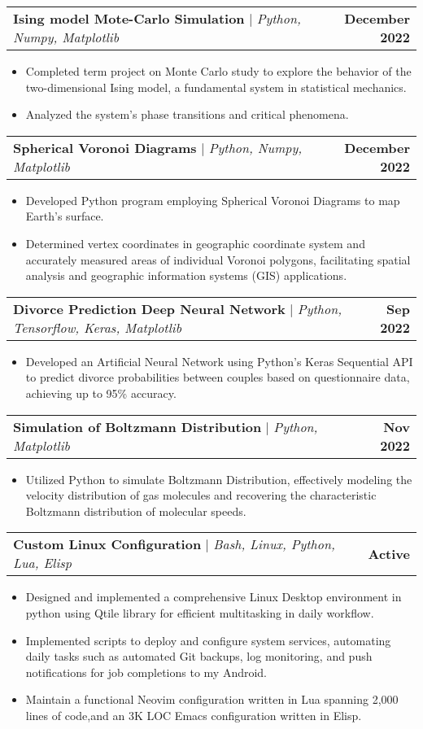 \documentclass[a4paper,11pt]{article}
\makeatletter
\newcommand{\resumeItem}[1]{
  \item\small{
    {#1 \vspace{-2pt}}
  }
}
\newcommand{\resumeProjectHeading}[2]{
    \item
    \begin{tabular*}{1.001\textwidth}{l@{\extracolsep{\fill}}r}
      \small#1 & \textbf{\small #2}\\
    \end{tabular*}\vspace{-7pt}
}
\newcommand{\resumeItemListStart}{\begin{itemize}}
\newcommand{\resumeItemListEnd}{\end{itemize}\vspace{-5pt}}
\makeatother
\begin{document}
          \resumeProjectHeading
          {\textbf{Ising model Mote-Carlo Simulation} $|$ \emph{Python, Numpy, Matplotlib}}{December 2022}
          \resumeItemListStart
            \resumeItem{Completed term project on Monte Carlo study to
                        explore the behavior of the two-dimensional Ising model, a fundamental system in
                        statistical mechanics.}
            \resumeItem{Analyzed the system's phase transitions and critical phenomena.}
          \resumeItemListEnd
          \vspace{-15pt}


          \resumeProjectHeading
          {\textbf{Spherical Voronoi Diagrams} $|$ \emph{Python, Numpy, Matplotlib}}{December 2022}
          \resumeItemListStart
            \resumeItem{Developed Python program employing Spherical Voronoi Diagrams to map Earth's surface.}
            \resumeItem{Determined vertex coordinates in geographic coordinate
                        system and accurately measured areas of individual Voronoi polygons,
                        facilitating spatial analysis and geographic information systems (GIS)
                        applications.}
          \resumeItemListEnd
          \vspace{-15pt}

          \resumeProjectHeading
          {\textbf{Divorce Prediction Deep Neural Network} $|$ \emph{Python, Tensorflow, Keras, Matplotlib}}{Sep 2022}
          \resumeItemListStart
            \resumeItem{Developed an Artificial Neural Network using Python's Keras Sequential API to predict divorce probabilities between couples based on questionnaire data, achieving up to 95\% accuracy.}
          \resumeItemListEnd
          \vspace{-15pt}

          \resumeProjectHeading
          {\textbf{Simulation of Boltzmann Distribution} $|$ \emph{Python, Matplotlib}}{Nov 2022}
          \resumeItemListStart
            \resumeItem{Utilized Python to simulate Boltzmann Distribution, effectively modeling the velocity distribution of gas molecules and recovering the characteristic Boltzmann distribution of molecular speeds.}
          \resumeItemListEnd
          \vspace{-15pt}


          \resumeProjectHeading
          {\textbf{Custom Linux Configuration} $|$ \emph{Bash, Linux, Python, Lua, Elisp}}{Active}
          \resumeItemListStart
            \resumeItem{Designed and implemented a comprehensive Linux Desktop environment in python using Qtile library for efficient multitasking in daily workflow.}
            \resumeItem{Implemented scripts to deploy and configure system services, automating daily tasks such as automated Git backups, log monitoring, and push notifications for job completions to my Android.}
            \resumeItem{Maintain a functional Neovim configuration written in
                        Lua spanning 2,000 lines of code,and an 3K LOC Emacs configuration written in Elisp.}
          \resumeItemListEnd
\end{document}
